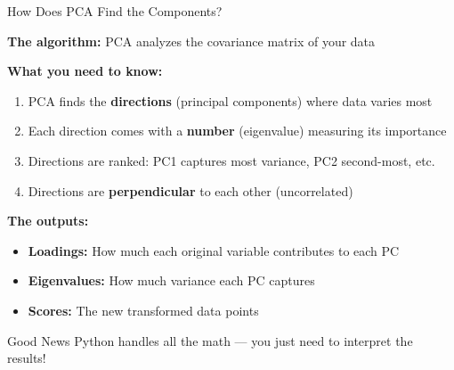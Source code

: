 \documentclass[10pt]{beamer}
\newcommand{\highlight}[1]{\textcolor{AccentOrange}{\textbf{#1}}}
\begin{document}
\begin{frame}{How Does PCA Find the Components?}

\textbf{The algorithm:} PCA analyzes the covariance matrix of your data

\vspace{1em}
\textbf{What you need to know:}
\begin{enumerate}
   \item PCA finds the \highlight{directions} (principal components) where data varies most
    \item Each direction comes with a \highlight{number} (eigenvalue) measuring its importance
   \item Directions are ranked: PC1 captures most variance, PC2 second-most, etc.
    \item Directions are \highlight{perpendicular} to each other (uncorrelated)
  \end{enumerate}

  \vspace{1em}
  \textbf{The outputs:}
  \begin{itemize}
    \item \textbf{Loadings:} How much each original variable contributes to each PC
    \item \textbf{Eigenvalues:} How much variance each PC captures
    \item \textbf{Scores:} The new transformed data points
  \end{itemize}

  \vspace{0.5em}
  \begin{block}{Good News}
    Python handles all the math --- you just need to interpret the results!
  \end{block}
\end{frame}
\end{document}
